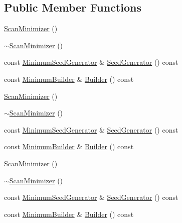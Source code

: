 \subsection*{Public Member Functions}
\begin{DoxyCompactItemize}
\item 
\mbox{\hyperlink{classROOT_1_1Minuit2_1_1ScanMinimizer_af77ed505a71c7a2ce4581adc38e6e025}{Scan\+Minimizer}} ()
\item 
\mbox{\hyperlink{classROOT_1_1Minuit2_1_1ScanMinimizer_a4c905e6b138573bf48d92cbcace158a7}{$\sim$\+Scan\+Minimizer}} ()
\item 
const \mbox{\hyperlink{classROOT_1_1Minuit2_1_1MinimumSeedGenerator}{Minimum\+Seed\+Generator}} \& \mbox{\hyperlink{classROOT_1_1Minuit2_1_1ScanMinimizer_aaad34811cf2862cd8b66b634a1c9ba07}{Seed\+Generator}} () const
\item 
const \mbox{\hyperlink{classROOT_1_1Minuit2_1_1MinimumBuilder}{Minimum\+Builder}} \& \mbox{\hyperlink{classROOT_1_1Minuit2_1_1ScanMinimizer_a6ca4b63ec20ed8dd310e02d427ef05fa}{Builder}} () const
\item 
\mbox{\hyperlink{classROOT_1_1Minuit2_1_1ScanMinimizer_af77ed505a71c7a2ce4581adc38e6e025}{Scan\+Minimizer}} ()
\item 
\mbox{\hyperlink{classROOT_1_1Minuit2_1_1ScanMinimizer_a4c905e6b138573bf48d92cbcace158a7}{$\sim$\+Scan\+Minimizer}} ()
\item 
const \mbox{\hyperlink{classROOT_1_1Minuit2_1_1MinimumSeedGenerator}{Minimum\+Seed\+Generator}} \& \mbox{\hyperlink{classROOT_1_1Minuit2_1_1ScanMinimizer_aaad34811cf2862cd8b66b634a1c9ba07}{Seed\+Generator}} () const
\item 
const \mbox{\hyperlink{classROOT_1_1Minuit2_1_1MinimumBuilder}{Minimum\+Builder}} \& \mbox{\hyperlink{classROOT_1_1Minuit2_1_1ScanMinimizer_a6ca4b63ec20ed8dd310e02d427ef05fa}{Builder}} () const
\item 
\mbox{\hyperlink{classROOT_1_1Minuit2_1_1ScanMinimizer_af77ed505a71c7a2ce4581adc38e6e025}{Scan\+Minimizer}} ()
\item 
\mbox{\hyperlink{classROOT_1_1Minuit2_1_1ScanMinimizer_a4c905e6b138573bf48d92cbcace158a7}{$\sim$\+Scan\+Minimizer}} ()
\item 
const \mbox{\hyperlink{classROOT_1_1Minuit2_1_1MinimumSeedGenerator}{Minimum\+Seed\+Generator}} \& \mbox{\hyperlink{classROOT_1_1Minuit2_1_1ScanMinimizer_aaad34811cf2862cd8b66b634a1c9ba07}{Seed\+Generator}} () const
\item 
const \mbox{\hyperlink{classROOT_1_1Minuit2_1_1MinimumBuilder}{Minimum\+Builder}} \& \mbox{\hyperlink{classROOT_1_1Minuit2_1_1ScanMinimizer_a6ca4b63ec20ed8dd310e02d427ef05fa}{Builder}} () const
\end{DoxyCompactItemize}


